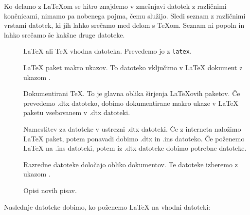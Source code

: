 Ko delamo z \LaTeX{}om se hitro znajdemo v zmešnjavi datotek z različnimi 
končnicami, nimamo pa nobenega pojma, čemu služijo. 
Sledi seznam z različnimi 
vrstami datotek, ki jih lahko srečamo med delom s 
\TeX{}om. Seznam ni popoln in lahko srečamo še kakšne druge datoteke.

\begin{description}
  
\item[] \LaTeX{} ali \TeX{} vhodna datoteka. Prevedemo jo z 
  \texttt{latex}.
\item[] \LaTeX{} paket makro ukazov. To datoteko vključimo v 
  \LaTeX{} dokument z ukazom .
\item[] Dokumentirani \TeX{}. To je glavna oblika širjenja 
  \LaTeX{}ovih paketov. Če prevedemo .dtx datoteko, dobimo
  dokumentirane makro ukaze v \LaTeX{} paketu vsebovanem v .dtx
  datoteki.
\item[] Namestitev za datoteke v ustrezni 
   .dtx datoteki. Če z interneta naložimo \LaTeX{} paket, potem ponavadi dobimo 
  .dtx in .ins datoteko. Če poženemo \LaTeX{} na .ins datoteki, potem iz .dtx datoteke
  dobimo potrebne datoteke.
\item[] Razredne datoteke določajo obliko dokumentov. Te datoteke izberemo 
  z ukazom .
\item[] Opisi novih pisav.
\end{description}
Naslednje datoteke dobimo, ko poženemo \LaTeX{} na vhodni datoteki:


